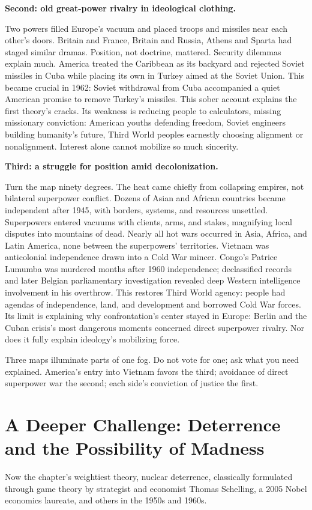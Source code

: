 \textbf{Second: old great-power rivalry in ideological clothing.}

Two powers filled Europe's vacuum and placed troops and missiles near each other's doors. Britain and France, Britain and Russia, Athens and Sparta had staged similar dramas. Position, not doctrine, mattered. Security dilemmas explain much. America treated the Caribbean as its backyard and rejected Soviet missiles in Cuba while placing its own in Turkey aimed at the Soviet Union. This became crucial in 1962: Soviet withdrawal from Cuba accompanied a quiet American promise to remove Turkey's missiles. This sober account explains the first theory's cracks. Its weakness is reducing people to calculators, missing missionary conviction: American youths defending freedom, Soviet engineers building humanity's future, Third World peoples earnestly choosing alignment or nonalignment. Interest alone cannot mobilize so much sincerity.

\textbf{Third: a struggle for position amid decolonization.}

Turn the map ninety degrees. The heat came chiefly from collapsing empires, not bilateral superpower conflict. Dozens of Asian and African countries became independent after 1945, with borders, systems, and resources unsettled. Superpowers entered vacuums with clients, arms, and stakes, magnifying local disputes into mountains of dead. Nearly all hot wars occurred in Asia, Africa, and Latin America, none between the superpowers' territories. Vietnam was anticolonial independence drawn into a Cold War mincer. Congo's Patrice Lumumba was murdered months after 1960 independence; declassified records and later Belgian parliamentary investigation revealed deep Western intelligence involvement in his overthrow. This restores Third World agency: people had agendas of independence, land, and development and borrowed Cold War forces. Its limit is explaining why confrontation's center stayed in Europe: Berlin and the Cuban crisis's most dangerous moments concerned direct superpower rivalry. Nor does it fully explain ideology's mobilizing force.

Three maps illuminate parts of one fog. Do not vote for one; ask what you need explained. America's entry into Vietnam favors the third; avoidance of direct superpower war the second; each side's conviction of justice the first.

\section[Deterrence and Possible Madness]{A Deeper Challenge: Deterrence and the Possibility of Madness}
Now the chapter's weightiest theory, nuclear deterrence, classically formulated through game theory by strategist and economist Thomas Schelling, a 2005 Nobel economics laureate, and others in the 1950s and 1960s.

